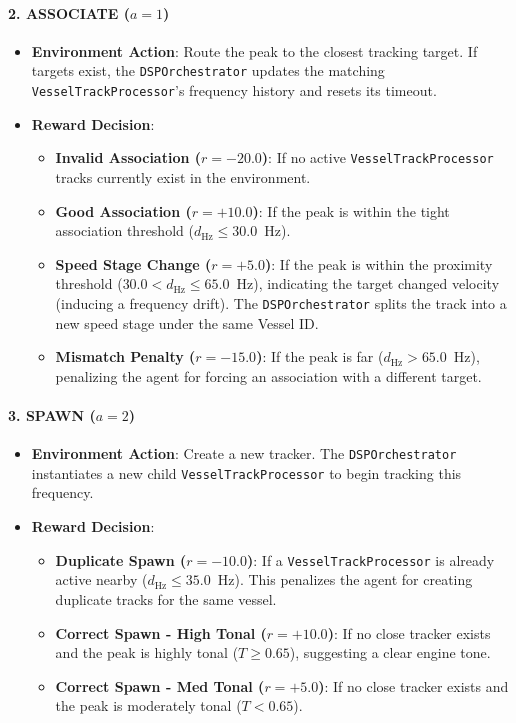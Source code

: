 \documentclass[12pt,a4paper]{article}
\begin{document}
\paragraph{2. ASSOCIATE ($a = 1$)}
\begin{itemize}
    \item \textbf{Environment Action}: Route the peak to the closest tracking target. If targets exist, the \texttt{DSPOrchestrator} updates the matching \texttt{VesselTrackProcessor}'s frequency history and resets its timeout.
    \item \textbf{Reward Decision}:
    \begin{itemize}
        \item \textbf{Invalid Association ($r = -20.0$)}: If no active \texttt{VesselTrackProcessor} tracks currently exist in the environment.
        \item \textbf{Good Association ($r = +10.0$)}: If the peak is within the tight association threshold ($d_{\text{Hz}} \le 30.0$~Hz).
        \item \textbf{Speed Stage Change ($r = +5.0$)}: If the peak is within the proximity threshold ($30.0 < d_{\text{Hz}} \le 65.0$~Hz), indicating the target changed velocity (inducing a frequency drift). The \texttt{DSPOrchestrator} splits the track into a new speed stage under the same Vessel ID.
        \item \textbf{Mismatch Penalty ($r = -15.0$)}: If the peak is far ($d_{\text{Hz}} > 65.0$~Hz), penalizing the agent for forcing an association with a different target.
    \end{itemize}
\end{itemize}

\paragraph{3. SPAWN ($a = 2$)}
\begin{itemize}
    \item \textbf{Environment Action}: Create a new tracker. The \texttt{DSPOrchestrator} instantiates a new child \texttt{VesselTrackProcessor} to begin tracking this frequency.
    \item \textbf{Reward Decision}:
    \begin{itemize}
        \item \textbf{Duplicate Spawn ($r = -10.0$)}: If a \texttt{VesselTrackProcessor} is already active nearby ($d_{\text{Hz}} \le 35.0$~Hz). This penalizes the agent for creating duplicate tracks for the same vessel.
        \item \textbf{Correct Spawn - High Tonal ($r = +10.0$)}: If no close tracker exists and the peak is highly tonal ($T \ge 0.65$), suggesting a clear engine tone.
        \item \textbf{Correct Spawn - Med Tonal ($r = +5.0$)}: If no close tracker exists and the peak is moderately tonal ($T < 0.65$).
    \end{itemize}
\end{itemize}
\end{document}
